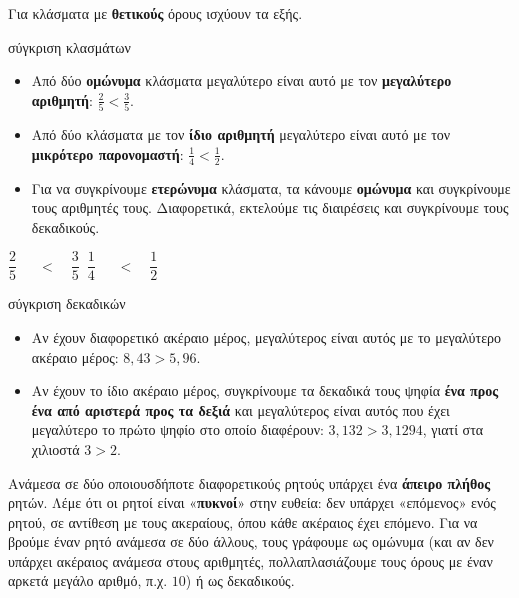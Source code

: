 
Για κλάσματα με \textbf{θετικούς} όρους ισχύουν τα εξής.

\begin{kanonas}{σύγκριση κλασμάτων}
\begin{itemize}[leftmargin=1.2em,itemsep=0.3ex,topsep=2pt]
\item Από δύο \textbf{ομώνυμα} κλάσματα μεγαλύτερο είναι αυτό με τον \textbf{μεγαλύτερο αριθμητή}: $\frac{2}{5}<\frac{3}{5}$.
\item Από δύο κλάσματα με τον \textbf{ίδιο αριθμητή} μεγαλύτερο είναι αυτό με τον \textbf{μικρότερο παρονομαστή}: $\frac{1}{4}<\frac{1}{2}$.
\item Για να συγκρίνουμε \textbf{ετερώνυμα} κλάσματα, τα κάνουμε \textbf{ομώνυμα} και συγκρίνουμε τους αριθμητές τους. Διαφορετικά, εκτελούμε τις διαιρέσεις και συγκρίνουμε τους δεκαδικούς.
\end{itemize}
\end{kanonas}

\begin{center}
\(\dfrac{2}{5}\)\ \ \ $<$\ \ \(\dfrac{3}{5}\)\ \qquad\qquad\(\dfrac{1}{4}\)\ \ \ $<$\ \ \(\dfrac{1}{2}\)\ 
\end{center}


\begin{kanonas}{σύγκριση δεκαδικών}
\begin{itemize}[leftmargin=1.2em,itemsep=0.3ex,topsep=2pt]
\item Αν έχουν διαφορετικό ακέραιο μέρος, μεγαλύτερος είναι αυτός με το μεγαλύτερο ακέραιο μέρος: $8{,}43>5{,}96$.
\item Αν έχουν το ίδιο ακέραιο μέρος, συγκρίνουμε τα δεκαδικά τους ψηφία \textbf{ένα προς ένα από αριστερά προς τα δεξιά} και μεγαλύτερος είναι αυτός που έχει μεγαλύτερο το πρώτο ψηφίο στο οποίο διαφέρουν: $3{,}132>3{,}1294$, γιατί στα χιλιοστά $3>2$.
\end{itemize}
\end{kanonas}


Ανάμεσα σε δύο οποιουσδήποτε διαφορετικούς ρητούς υπάρχει ένα \textbf{άπειρο πλήθος} ρητών. Λέμε ότι οι ρητοί είναι «\textbf{πυκνοί}» στην ευθεία: δεν υπάρχει «επόμενος» ενός ρητού, σε αντίθεση με τους ακεραίους, όπου κάθε ακέραιος έχει επόμενο. Για να βρούμε έναν ρητό ανάμεσα σε δύο άλλους, τους γράφουμε ως ομώνυμα (και αν δεν υπάρχει ακέραιος ανάμεσα στους αριθμητές, πολλαπλασιάζουμε τους όρους με έναν αρκετά μεγάλο αριθμό, π.χ. $10$) ή ως δεκαδικούς.

